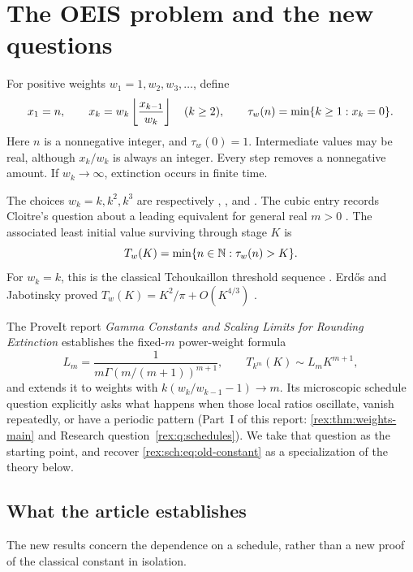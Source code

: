 \section{The OEIS problem and the new questions}
\label{rex:sch:sec:introduction}

For positive weights $w_1=1,w_2,w_3,\ldots$, define
\begin{equation}\label{rex:sch:eq:forward}
 x_1=n,\qquad x_k=w_k\left\lfloor \frac{x_{k-1}}{w_k}\right\rfloor\quad(k\geq2),
 \qquad \tau_w(n)=\min\{k\geq1:x_k=0\}.
\end{equation}
Here $n$ is a nonnegative integer, and $\tau_w(0)=1$. Intermediate values
may be real, although $x_k/w_k$ is always an integer. Every step removes
a nonnegative amount. If $w_k\to\infty$, extinction occurs in finite time.

The choices $w_k=k,k^2,k^3$ are respectively ,
, and . The cubic entry records Cloitre's
question about a leading equivalent for general real $m>0$
\cite{oeis-linear,oeis-square,oeis-cube}. The associated least initial
value surviving through stage $K$ is
\begin{equation}\label{rex:sch:eq:threshold-definition}
 T_w(K)=\min\{n\in\mathbb N:\tau_w(n)>K\}.
\end{equation}
For $w_k=k$, this is the classical Tchoukaillon threshold sequence
. Erd\H{o}s and Jabotinsky proved
$T_w(K)=K^2/\pi+O(K^{4/3})$ \cite{erdos-jabotinsky}.

The ProveIt report \emph{Gamma Constants and Scaling Limits for Rounding
Extinction} establishes the fixed-$m$ power-weight formula
\begin{equation}\label{rex:sch:eq:old-constant}
 L_m=\frac{1}{m\Gamma(m/(m+1))^{m+1}},\qquad
 T_{k^m}(K)\sim L_mK^{m+1},
\end{equation}
and extends it to weights with $k(w_k/w_{k-1}-1)\to m$. Its microscopic
schedule question explicitly asks what happens when those local ratios
oscillate, vanish repeatedly, or have a periodic pattern
(Part~I of this report: \cref{rex:thm:weights-main} and Research
question~\ref{rex:q:schedules}). We take that question as the starting
point, and recover \eqref{rex:sch:eq:old-constant} as a specialization of the
theory below.

\subsection{What the article establishes}

The new results concern the dependence on a schedule, rather than a new
proof of the classical constant in isolation.

